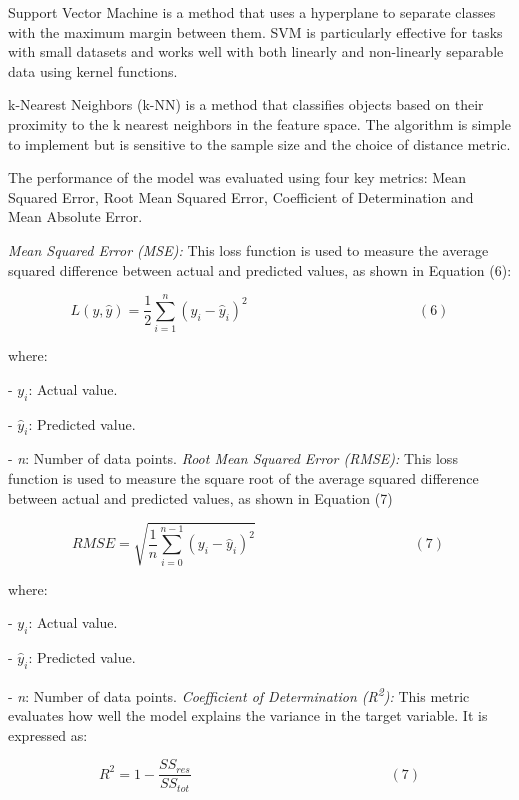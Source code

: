 Support Vector Machine is a method that uses a hyperplane to separate
classes with the maximum margin between them. SVM is particularly
effective for tasks with small datasets and works well with both
linearly and non-linearly separable data using kernel functions.

k-Nearest Neighbors (k-NN) is a method that classifies objects based on
their proximity to the k nearest neighbors in the feature space. The
algorithm is simple to implement but is sensitive to the sample size and
the choice of distance metric.

The performance of the model was evaluated using four key metrics: Mean
Squared Error, Root Mean Squared Error, Coefficient of Determination and
Mean Absolute Error.

\emph{Mean Squared Error (MSE):} This loss function is used to measure
the average squared difference between actual and predicted values, as
shown in Equation (6):

\[L\left( y,\widehat{y} \right) = \frac{1}{2}\sum_{i = 1}^{n}{{(y_{i} - {\widehat{y}}_{i})}^{2}\ }\ \ \ \ \ \ \ \ \ \ \ \ \ \ \ \ \ \ \ \ \ \ \ \ \ \ \ \ \ \ \ \ \ \ \ \ \ \ \ \ \ \ \ \ \ \ \ \ \ \ \ \ \ \ (6)\]

where:


- \(y_{i}\): Actual value.

- \({\widehat{y}}_{i}\)\hspace{0pt}: Predicted value.

- \emph{n}: Number of data points.
\emph{Root Mean Squared Error (RMSE):} This loss function is used to
measure the square root of the average squared difference between actual
and predicted values, as shown in Equation (7)

\[RMSE = \sqrt{\frac{1}{n}\sum_{i = 0}^{n - 1}{(y_{i} - {\widehat{y}}_{i})}^{2}}\ \ \ \ \ \ \ \ \ \ \ \ \ \ \ \ \ \ \ \ \ \ \ \ \ \ \ \ \ \ \ \ \ \ \ \ \ \ \ \ \ \ \ \ \ \ \ \ \ \ \ (7)\ \]

where:


- \(y_{i}\): Actual value.

- \({\widehat{y}}_{i}\)\hspace{0pt}: Predicted value.

- \emph{n}: Number of data points.
\emph{Coefficient of Determination (R\textsuperscript{2}):} This metric
evaluates how well the model explains the variance in the target
variable. It is expressed as:

\[R^{2} = 1 - \frac{{SS}_{res}}{{SS}_{tot}}\ \ \ \ \ \ \ \ \ \ \ \ \ \ \ \ \ \ \ \ \ \ \ \ \ \ \ \ \ \ \ \ \ \ \ \ \ \ \ \ \ \ \ \ \ \ \ \ \ \ \ \ \ \ \ \ \ \ \ \ \ \ \ \ (7)\]

